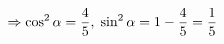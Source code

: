 \documentclass[preview]{standalone}
\begin{document}
\begin{align*}
\special{dvisvgm:raw <g id='unique000'>}\Rightarrow \cos^2\alpha=\frac{4}{5},\;\sin^2\alpha=1-\frac{4}{5}=\frac{1}{5}\special{dvisvgm:raw </g>}
\end{align*}
\end{document}
